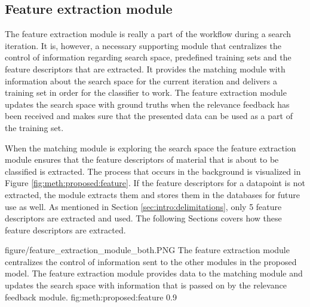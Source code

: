 \subsection{Feature extraction module}
\label{sec:method:proposed:features}
The feature extraction module is really  a part of the workflow during a search iteration. It is, however, a necessary supporting module that centralizes the control of information regarding search space, predefined training sets and the feature descriptors that are extracted. It provides the matching module with information about the search space for the current iteration and delivers a training set in order for the classifier to work. The feature extraction module updates the search space with ground truths when the relevance feedback has been received and makes sure that the presented data can be used as a part of the training set.

When the matching module is exploring the search space the feature extraction module ensures that the feature descriptors of material that is about to be classified is extracted. The process that occurs in the background is visualized in Figure \ref{fig:meth:proposed:feature}. If the feature descriptors for a datapoint is not extracted, the module extracts them and stores them in the databases for future use as well. As mentioned in Section \ref{sec:intro:delimitations}, only 5 feature descriptors are extracted and used. 
The following Sections covers how these feature descriptors are extracted. 


\singlefigure
{figure/feature_extraction_module_both.PNG}
{The feature extraction module centralizes the control of information sent to the other modules in the proposed model. The feature extraction module provides data to the matching module and updates the search space with information that is passed on by the relevance feedback module.}
{fig:meth:proposed:feature}
{0.9}






